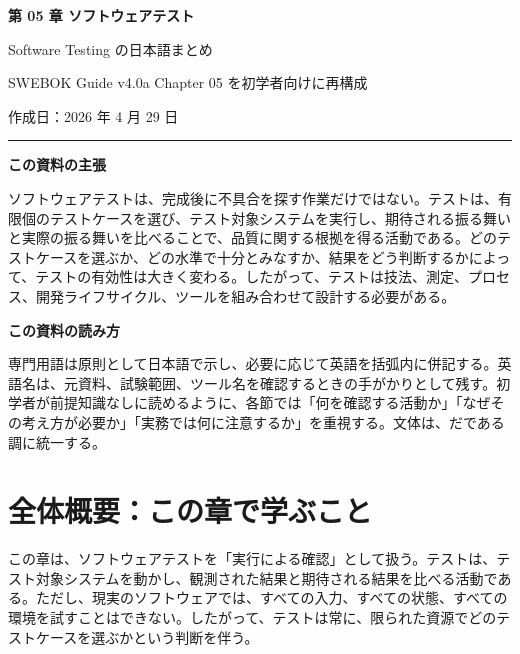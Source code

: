 \documentclass[uplatex,dvipdfmx,a4paper,11pt,nomag]{jsarticle}
\newenvironment{pointbox}[1]{\par\medskip\begin{shaded}\noindent\textbf{#1}\par\smallskip\noindent}{\end{shaded}\par\medskip}
\begin{document}
\begin{titlepage}
\centering
\vspace*{18mm}
{\LARGE\bfseries 第 05 章 ソフトウェアテスト\par}
\vspace{6mm}
{\large Software Testing の日本語まとめ\par}
\vspace{5mm}
{\normalsize SWEBOK Guide v4.0a Chapter 05 を初学者向けに再構成\par}
\vspace{7mm}
{\normalsize 作成日：2026 年 4 月 29 日\par}
\vspace{10mm}
\hrule
\vspace{3mm}
\begin{flushleft}
\textbf{この資料の主張}\par
ソフトウェアテストは、完成後に不具合を探す作業だけではない。テストは、有限個のテストケースを選び、テスト対象システムを実行し、期待される振る舞いと実際の振る舞いを比べることで、品質に関する根拠を得る活動である。どのテストケースを選ぶか、どの水準で十分とみなすか、結果をどう判断するかによって、テストの有効性は大きく変わる。したがって、テストは技法、測定、プロセス、開発ライフサイクル、ツールを組み合わせて設計する必要がある。\par
\vspace{3mm}
\begin{pointbox}{この資料の読み方}
専門用語は原則として日本語で示し、必要に応じて英語を括弧内に併記する。英語名は、元資料、試験範囲、ツール名を確認するときの手がかりとして残す。初学者が前提知識なしに読めるように、各節では「何を確認する活動か」「なぜその考え方が必要か」「実務では何に注意するか」を重視する。文体は、だである調に統一する。
\end{pointbox}
\end{flushleft}
\vfill
\end{titlepage}

\tableofcontents
\clearpage

\section*{全体概要：この章で学ぶこと}
この章は、ソフトウェアテストを「実行による確認」として扱う。テストは、テスト対象システムを動かし、観測された結果と期待される結果を比べる活動である。ただし、現実のソフトウェアでは、すべての入力、すべての状態、すべての環境を試すことはできない。したがって、テストは常に、限られた資源でどのテストケースを選ぶかという判断を伴う。
\end{document}
